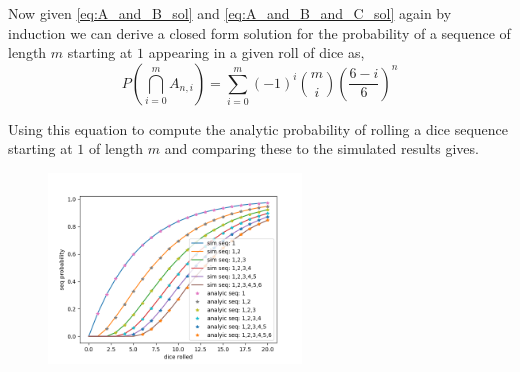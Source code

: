 \documentclass[12pt,a4paper]{article}
\begin{document}
Now given \cref{eq:A_and_B_sol} and \cref{eq:A_and_B_and_C_sol} again by induction we can derive a closed form solution for the probability of a sequence of length $m$ starting at $1$ appearing in a given roll of dice as,
\begin{equation}
P\left(\bigcap_{i=0}^m A_{n,i}\right) = \sum_{i=0}^{m} (-1)^i \binom{m}{i}\left( \frac{6-i}{6} \right)^n
\end{equation}

Using this equation to compute the analytic probability of rolling a dice sequence starting at $1$ of length $m$ and comparing these to the simulated results gives.

\begin{figure}[H]
    \centering
    \includegraphics[width=0.6\textwidth]{figs/full_compare_analytic_sim.png}
    \caption{}
    \label{fig:full_compare_analytic_sim}
\end{figure}
\end{document}
